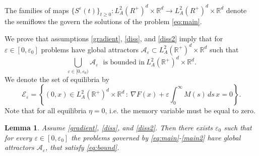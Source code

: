 \documentclass[11pt, leqno]{amsart}
\newtheorem{lem}[thm]{Lemma}
\theoremstyle{definition}
\def\R{\mathbb{R}}
\begin{document}
The families of maps $\{S^\varepsilon(t)\}_{t\geq 0}:L^2_A(R^+)^d\times \R^d \to L^2_A(R^+)^d\times \R^d$ denote the semiflows the govern the solutions of the problem \eqref{eq:main}.

We prove that assumptions \eqref{gradient}, \eqref{diss}, and \eqref{diss2} imply that for $\varepsilon\in [0,\varepsilon_0]$ problems  have global attractors  $\mathcal{A}_\varepsilon \subset  L^2_A(\R^+)^d\times \R^d$ such that
\begin{equation}\label{eq:bound}
\bigcup_{\varepsilon\in[0,\varepsilon_0)} \mathcal{A}_\varepsilon\ \ \ \textrm{is bounded in}\ L^2_A(\R^+)^d \times \R^d.
\end{equation}
We denote the set of equilibria by
$$
\mathcal{E}_\varepsilon = \left\{ (0,x)\in L^2_A(\R^+)^d\times \R^d\,:\ \nabla F(x) + \varepsilon\int_0^\infty M(s)\, ds\, x = 0\right\}.
$$
Note that for all equilibria $\eta=0$, i.e. the memory variable must be equal to zero. 
\begin{lem} \label{lem:atr-bnd}
	Assume \eqref{gradient}, \eqref{diss}, and \eqref{diss2}.  Then there exists $\varepsilon_0$ such that  for every $\varepsilon\in [0,\varepsilon_0]$ the problems governed by \eqref{eq:main}-\eqref{main2} have global attractors $\mathcal{A}_\varepsilon$, that satisfy \eqref{eq:bound}.
\end{lem}
\end{document}
